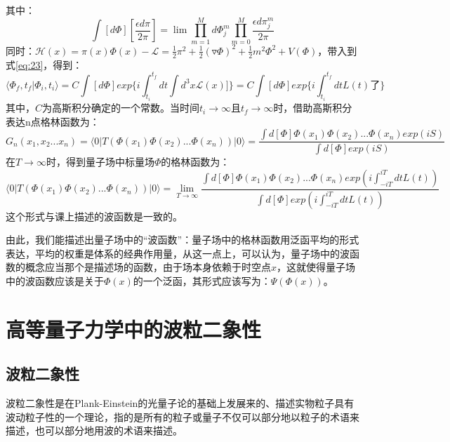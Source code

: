 \documentclass[10pt,a4paper]{article}
\begin{document}
其中：
\[
\int [d\Phi][\frac{\epsilon d\pi}{2\pi}]=\lim\prod_{m=1}^{M}d\Phi^m_j\prod_{m=0}^M\frac{\epsilon d\pi_{j}^m}{2\pi}
\]
同时：$\mathcal{H}(x)=\pi(x)\Phi(x)-\mathcal{L}=\frac{1}{2}\pi^2+\frac{1}{2}(\triangledown\Phi)^2+\frac{1}{2}m^2\Phi^2+V(\Phi)$，带入到式\eqref{eq:23}，得到：
\begin{equation}
\label{eq:24}
\langle\Phi_f,t_f|\Phi_i,t_i\rangle=C\int [d\Phi]exp\{i\int_{t_i}^{t_f}dt \int d^3x\mathcal{L}(x)]\}=C\int [d\Phi]exp\{i\int_{t_i}^{t_f}dt L(t)了\}
\end{equation}
其中，$C$为高斯积分确定的一个常数。当时间$t_i\rightarrow\infty$且$t_f\rightarrow\infty$时，借助高斯积分表达n点格林函数为：
\begin{equation}
\label{eq:25}
G_n(x_1,x_2...x_n)=\langle 0|T(\Phi(x_1)\Phi(x_2)...\Phi(x_n))|0\rangle=\frac{\int d[\Phi]\Phi(x_1)\Phi(x_2)...\Phi(x_n)exp(iS)}{\int d[\Phi]exp(iS)}
\end{equation}
在$T\rightarrow\infty$时，得到量子场中标量场$\Phi$的格林函数为：
\begin{equation}
\label{eq:26}
\langle 0|T(\Phi(x_1)\Phi(x_2)...\Phi(x_n))|0\rangle=\lim_{T\rightarrow\infty}\frac{\int d[\Phi]\Phi(x_1)\Phi(x_2)...\Phi(x_n)exp(i\int_{-iT}^{iT}dtL(t))}{\int d[\Phi]exp(i\int_{-iT}^{iT}dtL(t))}
\end{equation}
这个形式与课上描述的波函数是一致的。

由此，我们能描述出量子场中的“波函数”：量子场中的格林函数用泛函平均的形式表达，平均的权重是体系的经典作用量，从这一点上，可以认为，量子场中的波函数的概念应当那个是描述场的函数，由于场本身依赖于时空点$x$，这就使得量子场中的波函数应该是关于$\Phi(x)$的一个泛函，其形式应该写为：$\Psi(\Phi(x))$。

\newpage
\section{高等量子力学中的波粒二象性}
\label{sec:2}
\subsection{波粒二象性}
\label{sec:2.1}
波粒二象性是在Plank-Einstein的光量子论的基础上发展来的、描述实物粒子具有波动粒子性的一个理论，指的是所有的粒子或量子不仅可以部分地以粒子的术语来描述，也可以部分地用波的术语来描述。\cite{普谨言}
\end{document}

